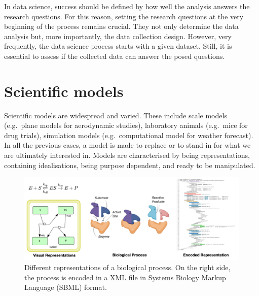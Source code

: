 \documentclass[
]{book}
\begin{document}
In data science, success should be defined by how well the analysis answers the research questions. For this reason, setting the research questions at the very beginning of the process remains crucial. They not only determine the data analysis but, more importantly, the data collection design. However, very frequently, the data science process starts with a given dataset. Still, it is essential to assess if the collected data can answer the posed questions.

\hypertarget{scientific-models}{%
\section{Scientific models}\label{scientific-models}}

Scientific models are widespread and varied. These include scale models (e.g.~plane models for aerodynamic studies), laboratory animals (e.g.~mice for drug trials), simulation models (e.g.~computational model for weather forecast). In all the previous cases, a model is made to replace or to stand in for what we are ultimately interested in. Models are characterised by being representations, containing idealisations, being purpose dependent, and ready to be manipulated.

\begin{figure}

{\centering \includegraphics[width=1\linewidth]{Figures/sbml_model} 

}

\caption{Different representations of a biological process. On the right side, the process is encoded in a XML file in Systems Biology Markup Language (SBML) format. }\label{fig:sbml-model}
\end{figure}
\end{document}
